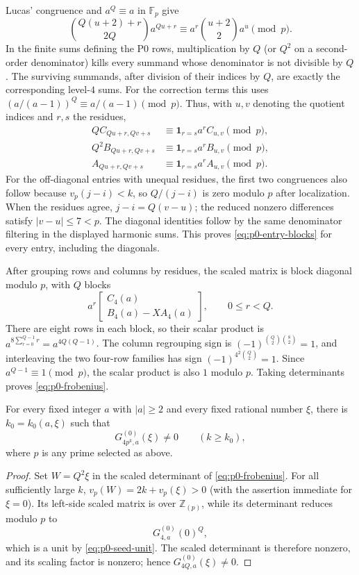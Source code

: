 Lucas' congruence and $a^Q\equiv a$ in $\mathbb F_p$ give
\[
 \binom{Q(u+2)+r}{2Q}a^{Qu+r}
 \equiv a^r\binom{u+2}{2}a^u\pmod p.
\]
In the finite sums defining the P0 rows, multiplication by $Q$ (or $Q^2$
on a second-order denominator) kills every summand whose denominator is not
divisible by $Q$.  The surviving summands, after division of their indices by
$Q$, are exactly the corresponding level-$4$ sums.  For the correction terms
this uses $(a/(a-1))^Q\equiv a/(a-1)\pmod p$.  Thus, with $u,v$ denoting
the quotient indices and $r,s$ the residues,
\begin{align}
 Q C_{Qu+r,Qv+s}&\equiv \mathbf 1_{r=s}a^r C_{u,v}\pmod p,\\
 Q^2 B_{Qu+r,Qv+s}&\equiv \mathbf 1_{r=s}a^r B_{u,v}\pmod p,\\
 A_{Qu+r,Qv+s}&\equiv \mathbf 1_{r=s}a^r A_{u,v}\pmod p.
 \label{eq:p0-entry-blocks}
\end{align}
For the off-diagonal entries with unequal residues, the first two congruences
also follow because $v_p(j-i)<k$, so $Q/(j-i)$ is zero modulo $p$ after
localization.  When the residues agree, $j-i=Q(v-u)$; the reduced nonzero
differences satisfy $|v-u|\le7<p$.  The diagonal identities follow by the
same denominator filtering in the displayed harmonic sums.  This proves
\eqref{eq:p0-entry-blocks} for every entry, including the diagonals.

After grouping rows and columns by residues, the scaled matrix is block
diagonal modulo $p$, with $Q$ blocks
\[
 a^r\begin{bmatrix}C_4(a)\\ B_4(a)-XA_4(a)\end{bmatrix},
 \qquad 0\le r<Q.
\]
There are eight rows in each block, so their scalar product is
$a^{8\sum_{r=0}^{Q-1}r}=a^{4Q(Q-1)}$.  The column regrouping sign is
$(-1)^{\binom Q2\binom82}=1$, and interleaving the two four-row families
has sign $(-1)^{4^2\binom Q2}=1$.  Since $a^{Q-1}\equiv1\pmod p$, the
scalar product is also $1$ modulo $p$.  Taking determinants proves
\eqref{eq:p0-frobenius}.

\begin{lemma}\label{lem:p0-eventual-nonzero}
For every fixed integer $a$ with $|a|\ge2$ and every fixed rational number
$\xi$, there is $k_0=k_0(a,\xi)$ such that
\[
 G^{(0)}_{4p^k,a}(\xi)\ne0\qquad(k\ge k_0),
\]
where $p$ is any prime selected as above.
\end{lemma}
\begin{proof}
Set $W=Q^2\xi$ in the scaled determinant of
\eqref{eq:p0-frobenius}.  For all sufficiently large $k$,
$v_p(W)=2k+v_p(\xi)>0$ (with the assertion immediate for $\xi=0$).  Its
left-side scaled matrix is over $\mathbb Z_{(p)}$, while its determinant
reduces modulo $p$ to
\[
 G^{(0)}_{4,a}(0)^Q,
\]
which is a unit by \eqref{eq:p0-seed-unit}.  The scaled determinant is
therefore nonzero, and its scaling factor is nonzero; hence
$G^{(0)}_{4Q,a}(\xi)\ne0$.
\end{proof}

